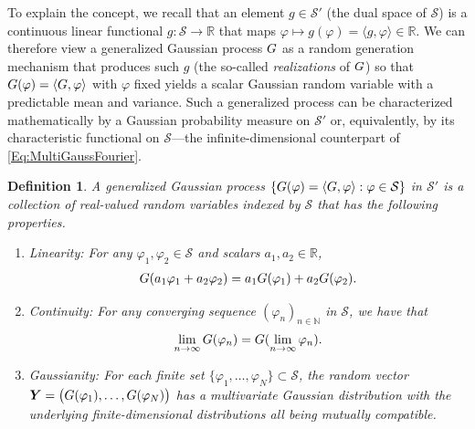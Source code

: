 \documentclass[11pt, english,english]{article}
\newtheorem{definition}{Definition}
\newcommand{\R}{ \mathbb{R}}
\newcommand{\N}{ \mathbb{N}}
\def\Spc#1{{\mathcal{#1}}}  %
\renewcommand{\[}{\begin{equation}}
\renewcommand{\]}[1]{\label{eq:#1}\end{equation}}
\def\VRand#1{{\uppercase{\boldsymbol #1}}}         %
\def\gRand#1{{\uppercase{ #1}}}         %
\begin{document}
To explain the concept, we recall that an element
$g\in \Spc S'$ (the dual space of $\Spc S$) is a continuous linear functional $g: \Spc S \to \R$ that maps $\varphi \mapsto g(\varphi)=\langle g, \varphi\rangle \in \R$. We can therefore view a generalized Gaussian process $\gRand g$ as a random generation mechanism that produces such $g$ (the so-called {\em realizations} of $\gRand g$) so that $\gRand g(\varphi)=\langle G, \varphi\rangle$ with $\varphi$ fixed yields a scalar Gaussian random variable with a predictable mean and variance. Such a generalized process can be characterized mathematically by a Gaussian probability measure on $\Spc S'$ or, equivalently, by its characteristic functional on $\Spc S$---the infinite-dimensional counterpart of \eqref{Eq:MultiGaussFourier}.
\begin{definition}
\label{Theo:GGauss}
A {\em generalized Gaussian process} $\{\gRand g(\varphi)=\langle \gRand g,\varphi \rangle : \varphi \in \Spc S \}$ in $\Spc S'$ is a collection of real-valued random variables indexed by $\Spc S$ that has the following properties.
\begin{enumerate}
    \item Linearity: For any \( \varphi_1, \varphi_2 \in \Spc S \) and scalars \( a_1, a_2 \in \R \),
\begin{align*}
    \gRand g(a_1 \varphi_1 + a_2 \varphi_2) = a_1 \gRand g(\varphi_1) + a_2 \gRand g(\varphi_2).
\end{align*}
\item Continuity: For any converging sequence $(\varphi_n)_{n \in \N}$ in $\Spc S$, we have that
\begin{align*}
    \lim_{n \to \infty}\gRand G(\varphi_n) =\gRand G(\lim_{n \to \infty}\varphi_n).
\end{align*}

    \item Gaussianity:
    For each finite set \( \{\varphi_1, \dots, \varphi_N\} \subset \Spc S \), the random vector $\VRand Y=\big(\gRand g(\varphi_1), \dots, \gRand g(\varphi_N)\big)$ has a multivariate Gaussian distribution with the underlying finite-dimensional distributions all being mutually compatible.
\end{enumerate}
\end{definition}
\end{document}
